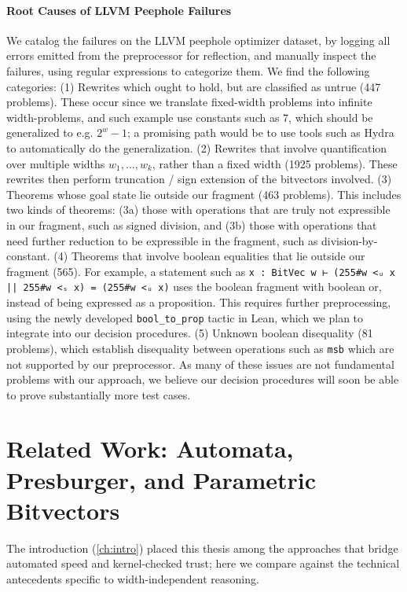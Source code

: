 \paragraph{Root Causes of LLVM Peephole Failures}
We catalog the failures on the LLVM peephole optimizer dataset,
by logging all errors emitted from the preprocessor for reflection,
and manually inspect the failures, using regular expressions to categorize them.
We find the following categories: (1) Rewrites which ought to hold, but are classified as untrue (447 problems).
These occur since we translate fixed-width problems into infinite width-problems, and such example use constants such as $7$,
which should be generalized to e.g. $2^w - 1$; a promising path would be to use
tools such as Hydra~\citep{hydra} to automatically do the
generalization.
(2) Rewrites that involve quantification over multiple widths $w_1, \dots, w_k$, rather than a fixed width (1925 problems).
These rewrites then perform truncation / sign extension of the bitvectors involved.
(3) Theorems whose goal state lie outside our fragment (463 problems). This includes two kinds of theorems:
(3a) those with operations that are truly not expressible in our fragment, such as signed division,
and (3b) those with operations that need further reduction to be expressible in the fragment, such as division-by-constant.
(4) Theorems that involve boolean equalities that lie outside our fragment (565).
For example, a statement such as \texttt{x : BitVec w ⊢ (255\#w <ᵤ x || 255\#w <ₛ x) = (255\#w <ᵤ x)} uses the
boolean fragment with boolean or, instead of being expressed as a proposition.
This requires further preprocessing, using the newly developed \texttt{bool\_to\_prop} tactic in Lean,
which we plan to integrate into our decision procedures.
(5) Unknown boolean disequality (81 problems), which establish disequality between operations such as \texttt{msb}
which are not supported by our preprocessor.
%
As many of these issues are not fundamental problems with our approach, we
believe our decision procedures will soon be able to prove substantially more
test cases.



\section{Related Work: Automata, Presburger, and Parametric Bitvectors}
\label{sec:mono:related}

The introduction (\cref{ch:intro}) placed this thesis among the approaches that bridge
automated speed and kernel-checked trust; here we compare against the technical
antecedents specific to width-independent reasoning.

